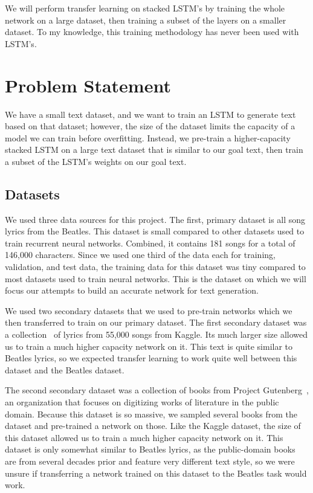 \documentclass[10pt,twocolumn,letterpaper]{article}
\begin{document}
		We will perform transfer learning on stacked LSTM's by training the whole network on a large dataset, then training a subset of the layers on a smaller dataset. To my knowledge, this training methodology has never been used with LSTM's.
\section{Problem Statement}
	We have a small text dataset, and we want to train an LSTM to generate text based on that dataset; however, the size of the dataset limits the capacity of a model we can train before overfitting. Instead, we pre-train a higher-capacity stacked LSTM on a large text dataset that is similar to our goal text, then train a subset of the LSTM's weights on our goal text.
	\subsection{Datasets}
		We used three data sources for this project. The first, primary dataset is all song lyrics from the Beatles. This dataset is small compared to other datasets used to train recurrent neural networks. Combined, it contains 181 songs for a total of 146,000 characters. Since we used one third of the data each for training, validation, and test data, the training data for this dataset was tiny compared to most datasets used to train neural networks. This is the dataset on which we will focus our attempts to build an accurate network for text generation.
		
		We used two secondary datasets that we used to pre-train networks which we then transferred to train on our primary dataset. The first secondary dataset was a collection~\cite{KaggleLyrics} of lyrics from 55,000 songs from Kaggle. Its much larger size allowed us to train a much higher capacity network on it. This text is quite similar to Beatles lyrics, so we expected transfer learning to work quite well between this dataset and the Beatles dataset.
		
		The second secondary dataset was a collection of books from Project Gutenberg~\cite{Gutenberg}, an organization that focuses on digitizing works of literature in the public domain. Because this dataset is so massive, we sampled several books from the dataset and pre-trained a network on those. Like the Kaggle dataset, the size of this dataset allowed us to train a much higher capacity network on it. This dataset is only somewhat similar to Beatles lyrics, as the public-domain books are from several decades prior and feature very different text style, so we were unsure if transferring a network trained on this dataset to the Beatles task would work.
		
\end{document}
